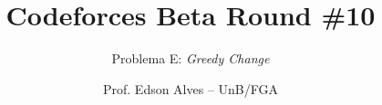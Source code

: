 \title{Codeforces Beta Round \#10}
\subtitle{Problema E: \textit{Greedy Change}}
\author{Prof. Edson Alves -- UnB/FGA}
\date{}
